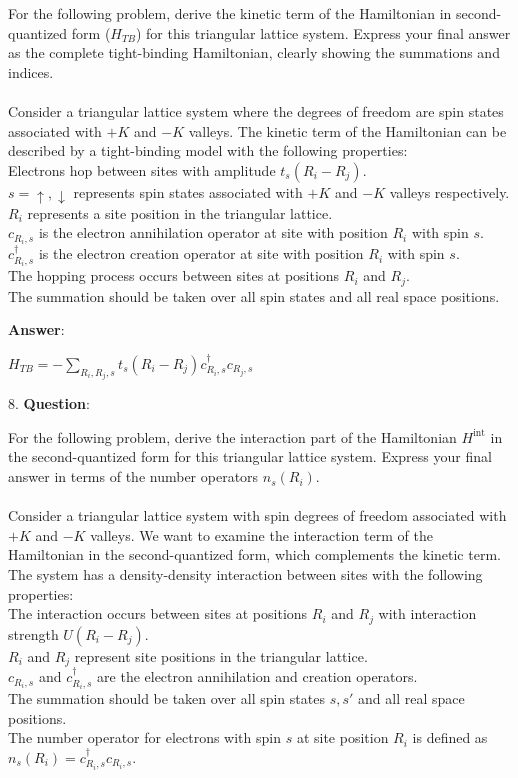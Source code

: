 \documentclass{article}
\begin{document}
   For the following problem, derive the kinetic term of the Hamiltonian in second-quantized form ($H_{TB}$) for this triangular lattice system. Express your final answer as the complete tight-binding Hamiltonian, clearly showing the summations and indices. \\ \\Consider a triangular lattice system where the degrees of freedom are spin states associated with $+K$ and $-K$ valleys. The kinetic term of the Hamiltonian can be described by a tight-binding model with the following properties: \\Electrons hop between sites with amplitude $t_s(R_i - R_j)$. \\$s = \uparrow,\downarrow$ represents spin states associated with $+K$ and $-K$ valleys respectively. \\$R_i$ represents a site position in the triangular lattice. \\$c_{R_i,s}$ is the electron annihilation operator at site with position $R_i$ with spin $s$. \\$c^{\dagger}_{R_i,s}$ is the electron creation operator at site with position $R_i$ with spin $s$. \\The hopping process occurs between sites at positions $R_i$ and $R_j$. \\The summation should be taken over all spin states and all real space positions.

   \textbf{Answer}:

   $H_{TB} = -\sum_{R_i,R_j,s} t_s(R_i - R_j)c^\dagger_{R_i,s}c_{R_j,s}$ \\


\clearpage

8. \textbf{Question}:

   For the following problem, derive the interaction part of the Hamiltonian $H^{\text{int}}$ in the second-quantized form for this triangular lattice system. Express your final answer in terms of the number operators $n_s(R_i)$. \\ \\Consider a triangular lattice system with spin degrees of freedom associated with $+K$ and $-K$ valleys. We want to examine the interaction term of the Hamiltonian in the second-quantized form, which complements the kinetic term. \\The system has a density-density interaction between sites with the following properties: \\The interaction occurs between sites at positions $R_i$ and $R_j$ with interaction strength $U(R_i - R_j)$. \\$R_i$ and $R_j$ represent site positions in the triangular lattice. \\$c_{R_i,s}$ and $c^{\dagger}_{R_i,s}$ are the electron annihilation and creation operators. \\The summation should be taken over all spin states $s, s'$ and all real space positions. \\The number operator for electrons with spin $s$ at site position $R_i$ is defined as $n_s(R_i) = c^{\dagger}_{R_i,s}c_{R_i,s}$.
\end{document}
